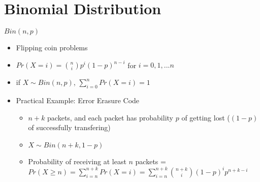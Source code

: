 \documentclass[a4paper]{article}
\begin{document}
\section{Binomial Distribution}
$Bin(n,p)$
\begin{itemize}
    \item Flipping coin problems 
    \item $Pr(X=i) = \binom{n}{i}p^i(1-p)^{n-i}$ for $i= 0, 1, ...n$
    \item if $X \sim Bin(n,p)$, $\sum_{i=0}^n Pr(X=i) = 1$
    \item Practical Example: Error Erasure Code
    \begin{itemize}
        \item $n+k$ packets, and each packet has probability $p$ of getting lost ($(1-p)$ of successfully transfering)
        \item $X \sim Bin(n+k, 1-p)$
        \item Probability of receiving at least $n$ packets = $Pr(X \geq n) = \sum_{i=n}^{n+k}Pr(X=i) = \sum_{i=n}^{n+k}\binom{n+k}{i}(1-p)^ip^{n+k-i}$

    \end{itemize}

\end{itemize}
\end{document}
